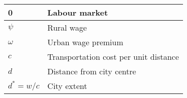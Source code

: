 \begin{longtable}{lp{10cm}}
\hline  0 &  \textbf{Labour market}                \\ \hline %
$\psi$            &  Rural wage                             \\  
$\omega$            &  Urban wage premium          \\
${c}$             &  Transportation cost per unit distance \\ %
$d$             &  Distance from city centre   \\
$d^* = w/{c}$    &  City extent \\ %


\end{longtable}
